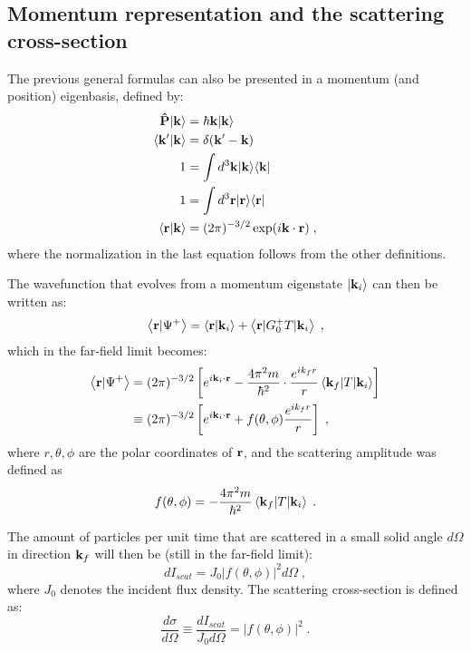 \subsection{Momentum representation and the scattering cross-section}

The previous general formulas can also be presented in a momentum (and position) eigenbasis, defined by:
\begin{align*}
  \mathbf{\hat{P}}\vert \mathbf{k} \rangle & = \hbar \mathbf{k} \vert \mathbf{k} \rangle \\
  \left\langle \mathbf{k'} \vert \mathbf{k} \right\rangle & = \delta(\mathbf{k'}-\mathbf{k}) \\
  1 &= \int d^3\mathbf{k} \vert \mathbf{k} \rangle \langle \mathbf{k} \vert \\
  1 &= \int d^3\mathbf{r} \vert \mathbf{r} \rangle \langle \mathbf{r} \vert \\
  \left\langle \mathbf{r} \vert \mathbf{k} \right\rangle &= (2\pi)^{-3/2} \exp (i\mathbf{k}\cdot\mathbf{r}) \; ,
\end{align*}
where the normalization in the last equation follows from the other definitions.

The wavefunction that evolves from a momentum eigenstate $\vert \mathbf{k}_i \rangle$ can then be written as:
\begin{equation*}
  \left\langle \mathbf{r} \vert \Psi^+ \right\rangle = \left\langle \mathbf{r} \vert \mathbf{k}_i \right\rangle + \left\langle \mathbf{r} \vert G_0^+T \vert \mathbf{k}_i \right\rangle \; ,
\end{equation*}
which in the far-field limit becomes:
\begin{align*}
  \left\langle \mathbf{r} \vert \Psi^+ \right\rangle &= (2\pi)^{-3/2}\left[ e^{i\mathbf{k}_i\cdot\mathbf{r}} - \frac{4\pi^2m}{\hbar^2}\cdot\frac{e^{ik_f r}}{r} \left\langle \mathbf{k}_f \vert T \vert \mathbf{k}_i \right\rangle \right]  \\
  &\equiv (2\pi)^{-3/2}\left[ e^{i\mathbf{k}_i\cdot\mathbf{r}} + f(\theta,\phi)\frac{e^{ik_f r}}{r} \right] \; ,
\end{align*}
where $r,\theta,\phi$ are the polar coordinates of $\mathbf{r}$,
and the scattering amplitude was defined as
\begin{equation*}
  f(\theta, \phi) = -\frac{4\pi^2m}{\hbar^2}\left\langle \mathbf{k}_f \vert T \vert \mathbf{k}_i \right\rangle \; .
\end{equation*}

The amount of particles per unit time that are scattered in a small solid angle $d\Omega$ in direction $\mathbf{k}_f$ will then be (still in the far-field limit):
\begin{equation*}
  dI_{scat} = J_0\lvert f(\theta,\phi)\rvert^2d\Omega \; ,
\end{equation*}
where $J_0$ denotes the incident flux density. The scattering cross-section is defined as:
\begin{equation*}
  \frac{d\sigma}{d\Omega}\equiv \frac{dI_{scat}}{J_0 d\Omega} = \lvert f(\theta,\phi) \rvert^2 \; .
\end{equation*}




